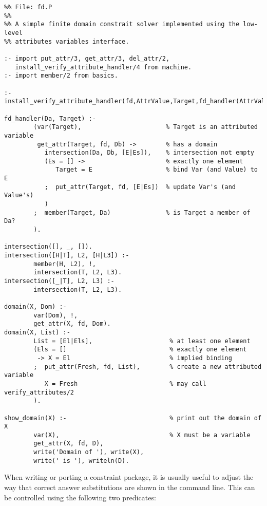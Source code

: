 \begin{small}
\begin{verbatim}
%% File: fd.P
%%
%% A simple finite domain constrait solver implemented using the low-level 
%% attributes variables interface.  

:- import put_attr/3, get_attr/3, del_attr/2, 
   install_verify_attribute_handler/4 from machine.
:- import member/2 from basics.

:- install_verify_attribute_handler(fd,AttrValue,Target,fd_handler(AttrValue,Target)).

fd_handler(Da, Target) :-
        (var(Target),                       % Target is an attributed variable
         get_attr(Target, fd, Db) ->        % has a domain
           intersection(Da, Db, [E|Es]),    % intersection not empty
           (Es = [] ->                      % exactly one element
              Target = E                    % bind Var (and Value) to E
           ;  put_attr(Target, fd, [E|Es])  % update Var's (and Value's)
           )
        ;  member(Target, Da)               % is Target a member of Da?
        ).

intersection([], _, []).
intersection([H|T], L2, [H|L3]) :-
        member(H, L2), !,
        intersection(T, L2, L3).
intersection([_|T], L2, L3) :-
        intersection(T, L2, L3).

domain(X, Dom) :- 
        var(Dom), !, 
        get_attr(X, fd, Dom). 
domain(X, List) :- 
        List = [El|Els],                     % at least one element 
        (Els = []                            % exactly one element
         -> X = El                           % implied binding 
        ;  put_attr(Fresh, fd, List),        % create a new attributed variable
           X = Fresh                         % may call verify_attributes/2
        ).

show_domain(X) :-                            % print out the domain of X
        var(X),                              % X must be a variable
        get_attr(X, fd, D),
        write('Domain of '), write(X),
        write(' is '), writeln(D).

\end{verbatim}
\end{small}

When writing or porting a constraint package, it is usually useful to
adjust the way that correct answer substitutions are shown in the
command line.  This can be controlled using the following two predicates:


